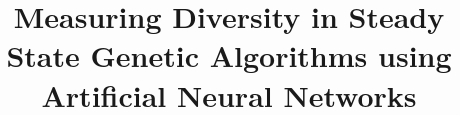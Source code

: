 \documentclass[a4paper]{IEEEconf}
\begin{document}
\title{Measuring Diversity in Steady State Genetic Algorithms using Artificial Neural Networks}


\maketitle

\listoftodos


\thispagestyle{plain}









\end{document}
